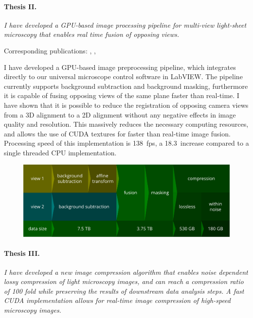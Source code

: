 \documentclass{booklet_style}
\begin{document}
  \paragraph{Thesis II.} \textit{I have developed a GPU-based image processing pipeline for multi-view light-sheet microscopy that enables real time fusion of opposing views.}

    Corresponding publications: \cite{balazs_gpu-based_2016}, \cite{balazs_gpu-based_2016-1}, \cite{balazs_gpu-based_2017}

    I have developed a GPU-based image preprocessing pipeline, which integrates directly to our universal microscope control software in LabVIEW. The pipeline currently supports background subtraction and background masking, furthermore it is capable of fusing opposing views of the same plane faster than real-time. I have shown that it is possible to reduce the registration of opposing camera views from a 3D alignment to a 2D alignment without any negative effects in image quality and resolution. This massively reduces the necessary computing resources, and allows the use of CUDA textures for faster than real-time image fusion. Processing speed of this implementation is \SI{138}{fps}, a 18.3\texttimes\ increase compared to a single threaded CPU implementation.


    \begin{figure}
      \centering
      \includegraphics[width=\textwidth]{4_gpu/pipeline}
      \label{fig:pipeline}
    \end{figure}
    

  \paragraph{Thesis III.} \textit{I have  developed a new image compression algorithm that enables noise dependent lossy compression of light microscopy images, and can reach a compression ratio of 100 fold while preserving the results of downstream data analysis steps. A fast CUDA implementation allows for real-time image compression of high-speed microscopy images.}
\end{document}
